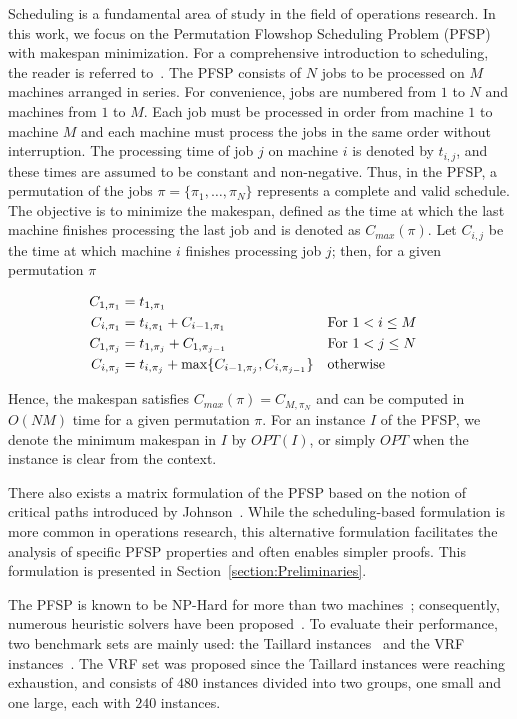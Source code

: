 \documentclass{article}
\theoremstyle{thmstyleone}%
\theoremstyle{thmstyletwo}%
\theoremstyle{thmstylethree}%
\begin{document}
Scheduling is a fundamental area of study in the field of operations research. 
In this work, we focus on the Permutation Flowshop Scheduling Problem (PFSP) with makespan minimization. 
For a comprehensive introduction to scheduling, the reader is referred to~\cite{pinedo-2022}. 
The PFSP consists of $N$ jobs to be processed on $M$ machines arranged in series. 
For convenience, jobs are numbered from $1$ to $N$ and machines from $1$ to $M$. 
Each job must be processed in order from machine $1$ to machine $M$ and each machine must process the jobs in the same order without interruption.  
The processing time of job $j$ on machine $i$ is denoted by $t_{i,j}$, and these times are assumed to be constant and non-negative.  
Thus, in the PFSP, a permutation of the jobs $\pi = \{\pi_1, \dots, \pi_N \}$ represents a complete and valid schedule. 
The objective is to minimize the makespan, defined as the time at which the last machine finishes processing the last job and is denoted as $C_{max}(\pi)$.
Let $C_{i, j}$ be the time at which machine $i$ finishes processing job $j$; then, for a given permutation $\pi$
\begin{small}
\begin{align}
    C_{1, \pi_1} &= t_{1, \pi_1} \notag\\
    C_{i, \pi_1} &= t_{i, \pi_1} + C_{i-1, \pi_1} && \text{For $1 < i \leq M$} \notag\\
    C_{1, \pi_j} &= t_{1, \pi_j} + C_{1, \pi_{j-1}} && \text{For $1 < j \leq N$} \notag\\
    C_{i, \pi_j} &= t_{i, \pi_j} + \max\{C_{i-1, \pi_j}, C_{i,\pi_{j-1}}\}  && \text{otherwise} \label{MakespanFormula}
\end{align}
\end{small}

Hence, the makespan satisfies $C_{max}(\pi) = C_{M, \pi_N}$ and can be computed in $O(NM)$ time for a given permutation $\pi$. 
For an instance $I$ of the PFSP, we denote the minimum makespan in $I$ by $OPT(I)$, or simply $OPT$ when the instance is clear from the context. 

There also exists a matrix formulation of the PFSP based on the notion of critical paths introduced by Johnson~\cite{JohnsonCriticalPath}. 
While the scheduling-based formulation is more common in operations research, this alternative formulation facilitates the analysis of specific PFSP properties and often enables simpler proofs. This formulation is presented in Section~\ref{section:Preliminaries}. 

The PFSP is known to be NP-Hard for more than two machines~\cite{NPHard}; 
consequently, numerous heuristic solvers have been proposed~\cite{ReviewReciente}. 
To evaluate their performance, two benchmark sets are mainly used: the Taillard instances~\cite{TaillardConjecture} and the VRF instances~\cite{InstancesVRF}. 
The VRF set was proposed since the Taillard instances were reaching exhaustion, and consists of $480$ instances divided into two groups, one small and one large, each with $240$ instances.
\end{document}
